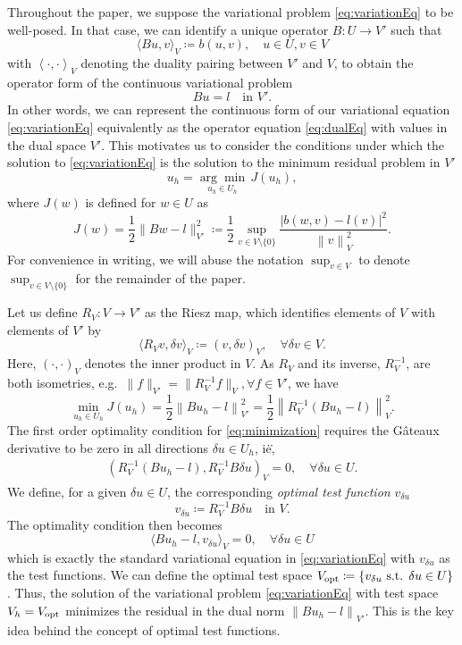 \documentclass{report}
\newcommand{\eqnlab}[1]{\label{eq:#1}}
\newcommand{\eqnref}[1]{\eqref{eq:#1}}
\newcommand{\nor}[1]{\left\| #1 \right\|}
\newcommand{\LRa}[1]{\left\langle #1 \right\rangle}
\begin{document}
Throughout the paper, we suppose the variational
problem \eqnref{variationEq} to be well-posed. In that case, we can
identify a unique operator $B:U\rightarrow V'$ such that
\[
\langle Bu,v\rangle_V \coloneqq b(u,v), \quad u\in U, v\in V
\]
with $\LRa{\cdot, \cdot}_V$ denoting the duality pairing between $V'$ and $V$, to obtain the operator form of the continuous variational problem
\begin{equation}
\eqnlab{dualEq}
Bu = l \quad \text{in } V'.
\end{equation}
In other words, we can represent the continuous form of our variational equation
\eqnref{variationEq} equivalently as the operator equation \eqnref{dualEq} with values in the
dual space $V'$.  This motivates us to consider the conditions under which the solution to \eqnref{variationEq} is the solution to the minimum residual problem in $V'$ 
\[
u_h = \underset{u_h\in U_h}{\arg\min}\, J(u_h),
\]
where $J(w)$ is defined for $w\in U$ as 
\[
J(w) = \frac{1}{2}\|Bw-l\|_{V'}^2 \coloneqq\frac{1}{2} \sup_{v\in V\setminus\{0\}} \frac{| b(w,v)-l(v)|^2}{\nor{v}_V^2}.
\]
For convenience in writing, we will abuse the notation $\sup_{v \in V}$ to denote $\sup_{v\in V\setminus\{0\}}$ for the remainder of the paper.

Let us define $R_V: V \to V'$ as the Riesz map, which identifies
elements of $V$ with elements of $V'$ by 
\[
\langle R_V v,\delta
v\rangle_V \coloneqq(v, \delta v)_V, \quad \forall \delta v \in V.
\]
Here, $(\cdot, \cdot)_V$ denotes the
inner product in $V$. As $R_V$ and its inverse, $R_V^{-1}$, are both
isometries, e.g.\ $\|f\|_{V'} = \|R_V^{-1} f\|_V, \forall f \in V'$, we
have
\begin{equation}
\eqnlab{minimization}
\min_{u_h\in U_h} J(u_h) = \frac{1}{2}\left\|Bu_h-l\right\|_{V'}^2 =  \frac{1}{2}\left\|R_V^{-1}(Bu_h-l)\right\|_V^2.
\end{equation}
The first order optimality condition for \eqnref{minimization} requires
the G\^ateaux derivative to be zero in all directions $\delta u \in
U_h$, i\.e\.,
\begin{align*}
\left(R_V^{-1}(Bu_h-l),R_V^{-1}B\delta u\right)_V = 0, \quad \forall \delta u \in U. 
\end{align*}
We define, for a given $\delta u \in U$, the corresponding {\em optimal test function} $v_{\delta u}$
\begin{equation}
\eqnlab{optv}
v_{\delta u} \coloneqq R_V^{-1}B\delta u \quad  \text{in } V.
\end{equation} 
The optimality condition then becomes
\[
 \langle Bu_h-l, v_{\delta u}\rangle_V = 0, \quad \forall \delta u \in U
\]
which is exactly the standard variational equation in
 \eqnref{variationEq} with $v_{\delta u}$ as the test functions. We can define the optimal test space $V_{\rm opt} \coloneqq \{v_{\delta u} \text{ s.t. } \delta u\in U\}$. Thus, the solution of the variational problem \eqnref{variationEq} with test space $V_h = V_{\rm opt}$ minimizes the residual in the dual norm $\nor{Bu_h-l}_{V'}$. This is the key idea behind the concept of optimal test functions. 
\end{document}
